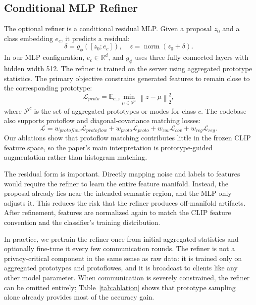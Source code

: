 ﻿\documentclass[runningheads]{llncs}
\newcommand{\clip}{CLIP}
\newcommand{\R}{\mathbb{R}}
\newcommand{\norm}[1]{\left\lVert #1 \right\rVert}
\begin{document}
\subsection{Conditional MLP Refiner}
The optional refiner is a conditional residual MLP. Given a proposal $z_0$ and a class embedding $e_c$, it predicts a residual:
\begin{equation}
\delta = g_\phi([z_0; e_c]), \quad z = \operatorname{norm}(z_0+\delta).
\end{equation}
In our MLP configuration, $e_c\in\R^d$, and $g_\phi$ uses three fully connected layers with hidden width 512. The refiner is trained on the server using aggregated prototype statistics. The primary objective constrains generated features to remain close to the corresponding prototype:
\begin{equation}
\mathcal{L}_{proto} = \mathbb{E}_{c,z}\min_{\mu\in\mathcal{P}^c}\norm{z-\mu}_2^2,
\end{equation}
where $\mathcal{P}^c$ is the set of aggregated prototypes or modes for class $c$. The codebase also supports protoflow and diagonal-covariance matching losses:
\begin{equation}
\mathcal{L} = w_{protoflow}\mathcal{L}_{protoflow}+w_{proto}\mathcal{L}_{proto}+w_{cov}\mathcal{L}_{cov}+w_{reg}\mathcal{L}_{reg}.
\end{equation}
Our ablations show that protoflow matching contributes little in the frozen \clip{} feature space, so the paper's main interpretation is prototype-guided augmentation rather than histogram matching.

The residual form is important. Directly mapping noise and labels to features would require the refiner to learn the entire feature manifold. Instead, the proposal already lies near the intended semantic region, and the MLP only adjusts it. This reduces the risk that the refiner produces off-manifold artifacts. After refinement, features are normalized again to match the \clip{} feature convention and the classifier's training distribution.

In practice, we pretrain the refiner once from initial aggregated statistics and optionally fine-tune it every few communication rounds. The refiner is not a privacy-critical component in the same sense as raw data: it is trained only on aggregated prototypes and protoflowes, and it is broadcast to clients like any other model parameter. When communication is severely constrained, the refiner can be omitted entirely; Table~\ref{tab:ablation} shows that prototype sampling alone already provides most of the accuracy gain.
\end{document}
